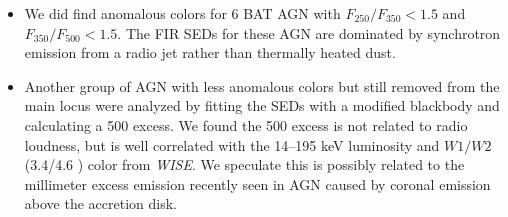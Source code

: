 \begin{itemize}
\item We did find anomalous colors for 6 BAT AGN with $F_{250}/F_{350} < 1.5$ and $F_{350}/F_{500} < 1.5$. The FIR SEDs for these AGN are dominated by synchrotron emission from a radio jet rather than thermally heated dust.
\item Another group of AGN with less anomalous colors but still removed from the main locus were analyzed by fitting the SEDs with a modified blackbody and calculating a 500 \um{} excess. We found the 500 \um{} excess is not related to radio loudness, but is well correlated with the 14--195 keV luminosity and $W1/W2$ (3.4/4.6 \um) color from \textit{WISE}. We speculate this is possibly related to the millimeter excess emission recently seen in AGN caused by coronal emission above the accretion disk.
\end{itemize}


  